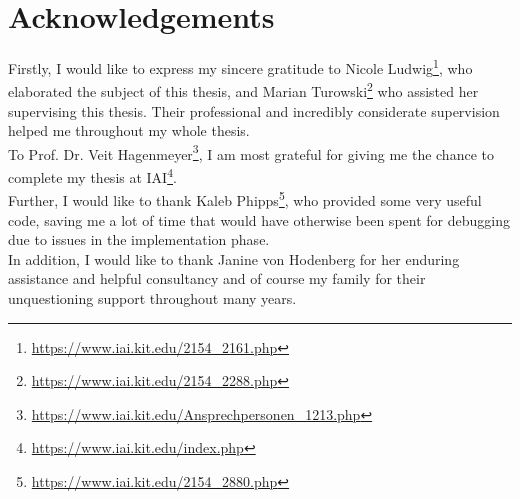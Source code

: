 \chapter*{Acknowledgements}

Firstly, I would like to express my sincere gratitude to Nicole Ludwig\footnote{\url{https://www.iai.kit.edu/2154_2161.php}}, who elaborated the subject of this thesis, and Marian Turowski\footnote{\url{https://www.iai.kit.edu/2154_2288.php}} who assisted her supervising this thesis. Their professional and incredibly considerate supervision helped me throughout my whole thesis.\\

To Prof. Dr. Veit Hagenmeyer\footnote{\url{https://www.iai.kit.edu/Ansprechpersonen_1213.php}}, I am most grateful for giving me the chance to complete my thesis at IAI\footnote{\url{https://www.iai.kit.edu/index.php}}.\\

Further, I would like to thank Kaleb Phipps\footnote{\url{https://www.iai.kit.edu/2154_2880.php}}, who provided some very useful code, saving me a lot of time that would have otherwise been spent for debugging due to issues in the implementation phase.\\

In addition, I would like to thank Janine von Hodenberg for her enduring assistance and helpful consultancy and of course my family for their unquestioning support throughout many years.\\

